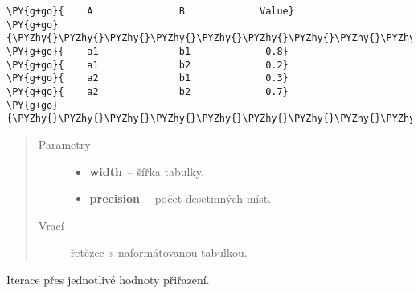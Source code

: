 \begin{fulllineitems}
\begin{fulllineitems}
\begin{Verbatim}[commandchars=\\\{\}]
\PY{g+go}{    A               B             Value}
\PY{g+go}{\PYZhy{}\PYZhy{}\PYZhy{}\PYZhy{}\PYZhy{}\PYZhy{}\PYZhy{}\PYZhy{}\PYZhy{}\PYZhy{}\PYZhy{}\PYZhy{}\PYZhy{}\PYZhy{}\PYZhy{}\PYZhy{}\PYZhy{}\PYZhy{}\PYZhy{}\PYZhy{}\PYZhy{}\PYZhy{}\PYZhy{}\PYZhy{}\PYZhy{}\PYZhy{}\PYZhy{}\PYZhy{}\PYZhy{}\PYZhy{}\PYZhy{}\PYZhy{}\PYZhy{}\PYZhy{}\PYZhy{}\PYZhy{}\PYZhy{}\PYZhy{}\PYZhy{}\PYZhy{}\PYZhy{}\PYZhy{}\PYZhy{}\PYZhy{}\PYZhy{}\PYZhy{}\PYZhy{}\PYZhy{}\PYZhy{}\PYZhy{}}
\PY{g+go}{    a1              b1             0.8}
\PY{g+go}{    a1              b2             0.2}
\PY{g+go}{    a2              b1             0.3}
\PY{g+go}{    a2              b2             0.7}
\PY{g+go}{\PYZhy{}\PYZhy{}\PYZhy{}\PYZhy{}\PYZhy{}\PYZhy{}\PYZhy{}\PYZhy{}\PYZhy{}\PYZhy{}\PYZhy{}\PYZhy{}\PYZhy{}\PYZhy{}\PYZhy{}\PYZhy{}\PYZhy{}\PYZhy{}\PYZhy{}\PYZhy{}\PYZhy{}\PYZhy{}\PYZhy{}\PYZhy{}\PYZhy{}\PYZhy{}\PYZhy{}\PYZhy{}\PYZhy{}\PYZhy{}\PYZhy{}\PYZhy{}\PYZhy{}\PYZhy{}\PYZhy{}\PYZhy{}\PYZhy{}\PYZhy{}\PYZhy{}\PYZhy{}\PYZhy{}\PYZhy{}\PYZhy{}\PYZhy{}\PYZhy{}\PYZhy{}\PYZhy{}\PYZhy{}\PYZhy{}\PYZhy{}}
\end{Verbatim}
\begin{quote}\begin{description}
\item[{Parametry}] \leavevmode\begin{itemize}
\item {} 
\textbf{width}~-- šířka tabulky.

\item {} 
\textbf{precision}~-- počet desetinných míst.

\end{itemize}

\item[{Vrací}] \leavevmode
řetězec s~naformátovanou tabulkou.

\end{description}\end{quote}

\end{fulllineitems}


\begin{fulllineitems}
\label{alex.infer:alex.infer.factor.Factor.__iter__}
Iterace přes jednotlivé hodnoty přiřazení.


\end{fulllineitems}
\end{fulllineitems}
